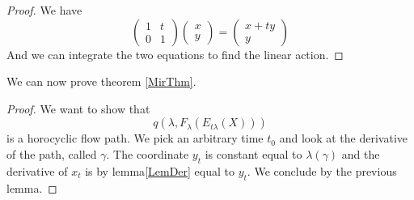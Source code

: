 \begin{proof}
We have \[
\begin{pmatrix} 1 & t \\ 0 & 1 \end{pmatrix} \begin{pmatrix} x \\ y \end{pmatrix} = \begin{pmatrix} x + t y \\ y \end{pmatrix}
\]
And we can integrate the two equations to find the linear action.
\end{proof}

We can now prove theorem \ref{MirThm}.

\begin{proof}
We want to show that \[
q(\lambda,F_{\lambda}(E_{t \lambda}(X)))
\]
is a horocyclic flow path. We pick an arbitrary time $t_0$ and look at the derivative of the path, called $\gamma$. The coordinate $y_t$ is constant equal to $\lambda(\gamma)$ and the derivative of $x_t$ is by lemma\ref{LemDer} equal to $y_t$. We conclude by the previous lemma.
\end{proof}
